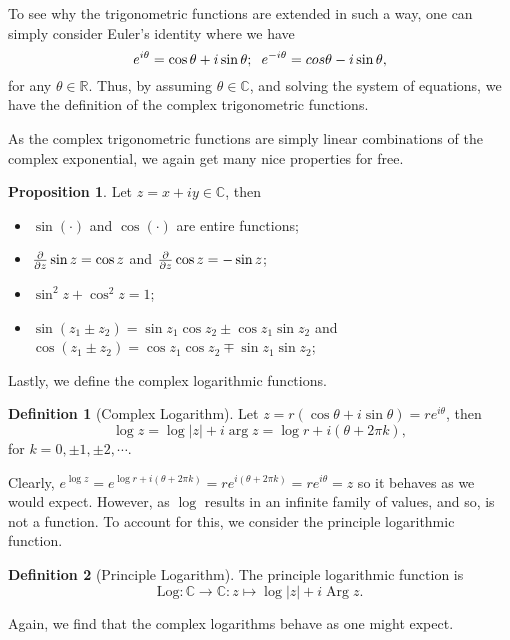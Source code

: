 \documentclass[
]{article}
\theoremstyle{definition}
\newtheorem{prop}{Proposition}
\theoremstyle{definition}
\newtheorem{definition}{Definition}[section]
\begin{document}
To see why the trigonometric functions are extended in such a way, one
can simply consider Euler's identity where we have
\[e^{i \theta} = \cos \theta + i \sin \theta; \hspace{2mm} e^{-i\theta} = cos \theta - i \sin \theta,\]
for any \(\theta \in \mathbb{R}\). Thus, by assuming
\(\theta \in \mathbb{C}\), and solving the system of equations, we have
the definition of the complex trigonometric functions.

As the complex trigonometric functions are simply linear combinations of
the complex exponential, we again get many nice properties for free.

\begin{prop}
  Let \(z = x + iy \in \mathbb{C}\), then 
  \begin{itemize}
    \item \(\sin (\cdot)\) and \(\cos (\cdot)\) are entire functions;
    \item \(\pdv{z}\sin z = \cos z\) and \(\pdv{z}\cos z = -\sin z\);
    \item \(\sin^2 z + \cos^2 z = 1\);
    \item \(\sin(z_1 \pm z_2) = \sin z_1 \cos z_2 \pm \cos z_1 \sin z_2\) and 
      \(\cos(z_1 \pm z_2) = \cos z_1 \cos z_2 \mp \sin z_1 \sin z_2\);
  \end{itemize}
\end{prop}

Lastly, we define the complex logarithmic functions.

\begin{definition}[Complex Logarithm]
  Let \(z = r(\cos\theta + i\sin\theta) = re^{i\theta}\), then 
  \[\log z = \log \left|z\right| + i \arg z = \log r + i(\theta + 2\pi k),\]
  for \(k = 0, \pm 1, \pm 2, \cdots\).
\end{definition}

Clearly,
\(e^{\log z} = e^{\log r + i(\theta + 2\pi k)} = r e^{i (\theta + 2\pi k)} = re^{i\theta} = z\)
so it behaves as we would expect. However, as \(\log\) results in an
infinite family of values, and so, is not a function. To account for
this, we consider the principle logarithmic function.

\begin{definition}[Principle Logarithm]
  The principle logarithmic function is 
  \[\text{Log} : \mathbb{C} \to \mathbb{C} : z \mapsto \log\left| z \right| + i\mathop{\mathrm{Arg}}z.\]
\end{definition}

Again, we find that the complex logarithms behave as one might expect.
\end{document}
